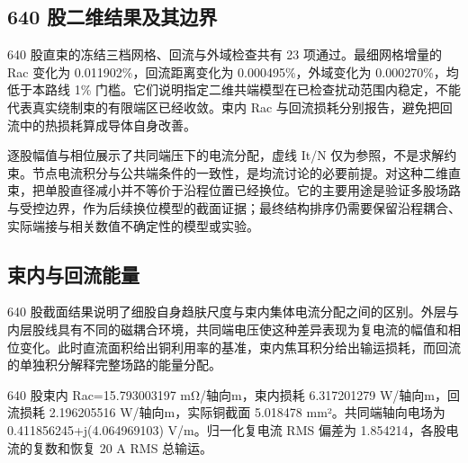 \documentclass[journal,10pt]{IEEEtran}
\begin{document}
\subsection*{640 股二维结果及其边界}
\hypertarget{04.coax_results.heading}{}
640 股直束的冻结三档网格、回流与外域检查共有 23 项通过。最细网格增量的 Rac 变化为 0.011902\%，回流距离变化为 0.000495\%，外域变化为 0.000270\%，均低于本路线 1\% 门槛。它们说明指定二维共端模型在已检查扰动范围内稳定，不能代表真实绕制束的有限端区已经收敛。束内 Rac 与回流损耗分别报告，避免把回流中的热损耗算成导体自身改善。


逐股幅值与相位展示了共同端压下的电流分配，虚线 It/N 仅为参照，不是求解约束。节点电流积分与公共端条件的一致性，是均流讨论的必要前提。对这种二维直束，把单股直径减小并不等价于沿程位置已经换位。它的主要用途是验证多股场路与受控边界，作为后续换位模型的截面证据；最终结构排序仍需要保留沿程耦合、实际端接与相关数值不确定性的模型或实验。


\subsection*{束内与回流能量}
\hypertarget{04.interpretation.heading}{}
640 股截面结果说明了细股自身趋肤尺度与束内集体电流分配之间的区别。外层与内层股线具有不同的磁耦合环境，共同端电压使这种差异表现为复电流的幅值和相位变化。此时直流面积给出铜利用率的基准，束内焦耳积分给出输运损耗，而回流的单独积分解释完整场路的能量分配。


640 股束内 Rac=15.793003197 mΩ/轴向m，束内损耗 6.317201279 W/轴向m，回流损耗 2.196205516 W/轴向m，实际铜截面 5.018478 mm²。共同端轴向电场为 0.411856245+j(4.064969103) V/m。归一化复电流 RMS 偏差为 1.854214，各股电流的复数和恢复 20 A RMS 总输运。
\end{document}
